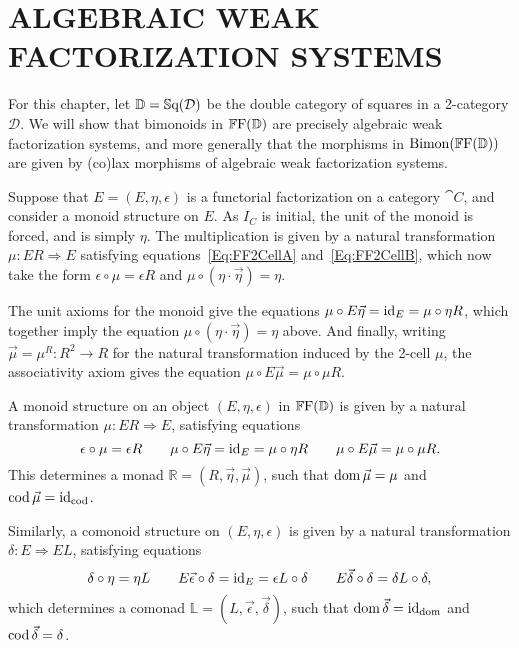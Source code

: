 
\chapter{ALGEBRAIC WEAK FACTORIZATION SYSTEMS}\label{Ch:Awfs}

For this chapter, let $\mathbb{D}=\mathbb{S}\mathrm{q}(\mathcal{D})$ be the double category of squares in a 2-category $\mathcal{D}$. We will show that bimonoids in $\mathbb{F}\mathrm{F}(\mathbb{D})$ are precisely algebraic weak factorization systems, and more generally that the morphisms in $\mathrm{Bimon}(\mathbb{F}\mathrm{F}(\mathbb{D}))$ are given by (co)lax morphisms of algebraic weak factorization systems.

Suppose that $E=(E,\eta,\epsilon)$ is a functorial factorization on a category $\cat{C}$, and consider a monoid structure on $E$. As $I_C$ is initial, the unit of the monoid is forced, and is simply $\eta$. The multiplication is given by a natural transformation $\mu\colon ER\Rightarrow E$ satisfying equations~\eqref{Eq:FF2CellA} and~\eqref{Eq:FF2CellB}, which now take the form $\epsilon\circ\mu = \epsilon R$ and $\mu\circ(\eta\cdot\vec{\eta})=\eta$.

The unit axioms for the monoid give the equations $\mu\circ E\vec{\eta}=\operatorname{id}_E=\mu\circ\eta R$, which together imply the equation $\mu\circ(\eta\cdot\vec{\eta})=\eta$ above. And finally, writing $\vec{\mu}=\mu^R\colon R^2\to R$ for the natural transformation induced by the 2-cell $\mu$, the associativity axiom gives the equation $\mu\circ E\vec{\mu}=\mu\circ\mu R$.

\begin{proposition}
	A monoid structure on an object $(E,\eta,\epsilon)$ in $\mathbb{F}\mathrm{F}(\mathbb{D})$ is given by a natural transformation $\mu\colon ER\Rightarrow E$, satisfying equations
	\begin{equation}
		\epsilon\circ\mu=\epsilon R \qquad 
			\mu\circ E\vec{\eta}=\operatorname{id}_E=\mu\circ\eta R \qquad 
			\mu\circ E\vec{\mu}=\mu\circ\mu R.
	\end{equation}
	This determines a monad $\mathbb{R}=(R,\vec{\eta},\vec{\mu})$, such that $\operatorname{dom}\vec{\mu}=\mu$ and $\operatorname{cod}\vec{\mu}=\operatorname{id}_{\operatorname{cod}}$.

	Similarly, a comonoid structure on $(E,\eta,\epsilon)$ is given by a natural transformation $\delta\colon E\Rightarrow EL$, satisfying equations
	\begin{equation}
		\delta\circ\eta=\eta L \qquad 
			E\vec{\epsilon}\circ\delta=\operatorname{id}_E=\epsilon L\circ\delta \qquad
			E\vec{\delta}\circ\delta=\delta L\circ\delta,
	\end{equation}
	which determines a comonad $\mathbb{L}=(L,\vec{\epsilon},\vec{\delta})$, such that $\operatorname{dom}\vec{\delta}=\operatorname{id}_{\operatorname{dom}}$ and $\operatorname{cod}\vec{\delta}=\delta$.
\end{proposition}

